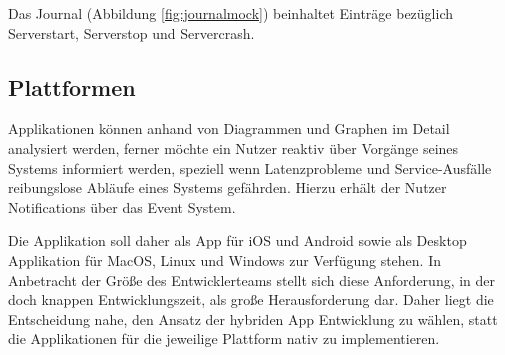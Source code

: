 Das Journal (Abbildung \ref{fig:journalmock}) beinhaltet Einträge bezüglich Serverstart, Serverstop und Servercrash.


\newpage

\subsection{Plattformen}

Applikationen können anhand von Diagrammen und Graphen im Detail analysiert werden,
ferner möchte ein Nutzer reaktiv über Vorgänge seines Systems informiert werden, speziell wenn Latenzprobleme und Service-Ausfälle reibungslose Abläufe eines Systems gefährden.
Hierzu erhält der Nutzer Notifications über das Event System.

Die Applikation soll daher als App für iOS und Android sowie als Desktop Applikation für MacOS, Linux und Windows zur Verfügung stehen.
In Anbetracht der Größe des Entwicklerteams stellt sich diese Anforderung, in der doch knappen Entwicklungszeit, als große Herausforderung dar.
Daher liegt die Entscheidung nahe, den Ansatz der hybriden App Entwicklung zu wählen, statt die Applikationen für die jeweilige Plattform nativ zu implementieren.
